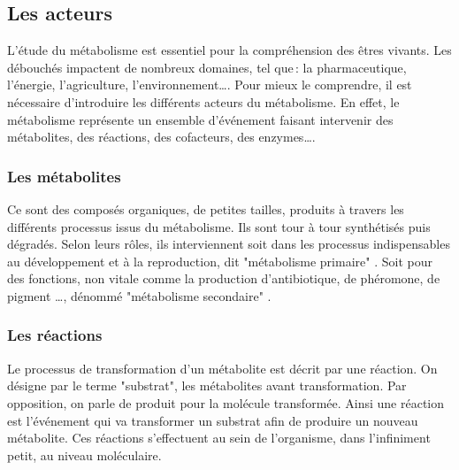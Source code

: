 \begin{refsection}
    \subsection{Les acteurs}
    
    L'étude du métabolisme est essentiel pour la compréhension des êtres vivants. Les débouchés impactent de nombreux domaines, tel que : la pharmaceutique, l'énergie, l'agriculture, l'environnement\ldots.  Pour mieux le comprendre, il est nécessaire d'introduire les différents acteurs du métabolisme. En effet, le métabolisme représente un ensemble d'événement faisant intervenir des métabolites, des réactions, des cofacteurs, des enzymes\ldots.
    
    
    
    \subsubsection{Les métabolites}
    
    Ce sont des composés organiques, de petites tailles, produits à travers les différents processus issus du métabolisme. Ils sont tour à tour synthétisés puis dégradés. Selon leurs rôles, ils interviennent soit dans les processus indispensables au développement et à la reproduction, dit "métabolisme primaire" . Soit pour des fonctions, non vitale comme la production d'antibiotique, de phéromone, de pigment \ldots, dénommé "métabolisme secondaire" .
    
      

	\subsubsection{Les réactions}
	Le processus de transformation d’un métabolite est décrit par une réaction. On désigne par le terme "substrat", les métabolites avant transformation. Par opposition, on parle de produit pour la molécule transformée. Ainsi une réaction est l'événement qui va transformer un substrat afin de produire un nouveau métabolite. Ces réactions s'effectuent au sein de l'organisme, dans l'infiniment petit, au niveau moléculaire.
    

\end{refsection}
